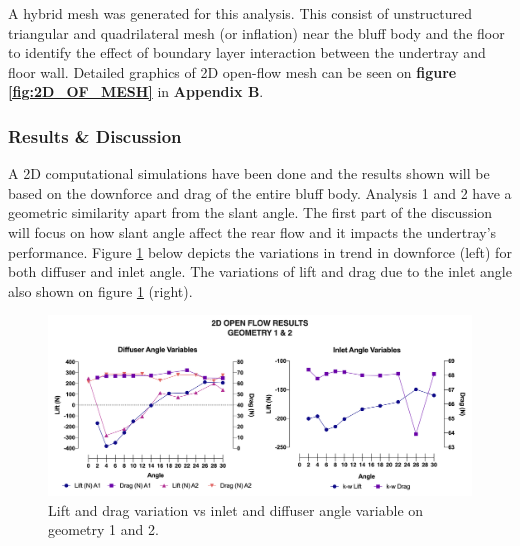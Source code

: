 \noindent A hybrid mesh was generated for this analysis. This consist of unstructured triangular and quadrilateral mesh (or inflation) near the bluff body and the floor to identify the effect of boundary layer interaction between the undertray and floor wall.  Detailed graphics of 2D open-flow mesh can be seen on \textbf{figure \ref{fig:2D_OF_MESH}} in \textbf{Appendix B}.



\subsubsection{Results \& Discussion}

\noindent A 2D computational simulations have been done and the results shown will be based on the downforce and drag of the entire bluff body. Analysis 1 and 2 have a geometric similarity apart from the slant angle. The first part of the discussion will focus on how slant angle affect the rear flow and it impacts the undertray's performance. Figure \ref{fig:2D_OF_A12_results} below depicts the variations in trend in downforce (left) for both diffuser and inlet angle. The variations of lift and drag due to the inlet angle also shown on figure \ref{fig:2D_OF_A12_results} (right).

\begin{figure}[!ht]
    \centering
    \includegraphics[scale = 0.6]{Figures/Graph/2D_OF_A1-2.png}
    \caption{Lift and drag variation vs inlet and diffuser angle variable on geometry 1 and 2. }
    \label{fig:2D_OF_A12_results}
\end{figure}

